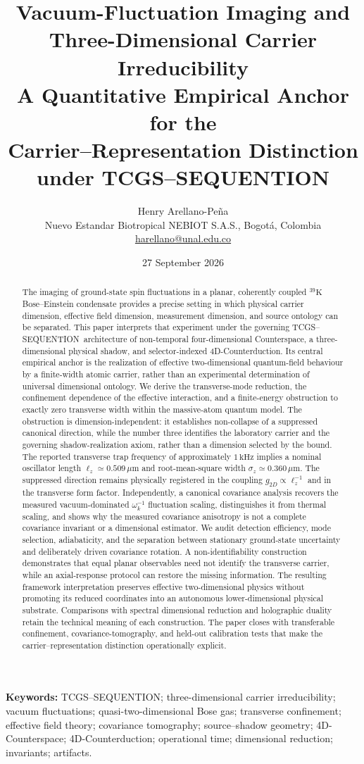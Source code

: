 \documentclass[11pt,a4paper]{article}
\title{Vacuum-Fluctuation Imaging and\\
Three-Dimensional Carrier Irreducibility\\[0.6em]
\large A Quantitative Empirical Anchor for the\\
Carrier--Representation Distinction under TCGS--SEQUENTION}
\author{Henry Arellano-Pe\~na\\\small Nuevo Estandar Biotropical NEBIOT S.A.S., Bogot\'a, Colombia\\\small\href{mailto:harellano@unal.edu.co}{harellano@unal.edu.co}}
\date{27 September 2026}
\theoremstyle{definition}
\theoremstyle{remark}
\newcommand{\TCGS}{TCGS--SEQUENTION}
\newcommand{\lop}{\ell_z}
\begin{document}
\maketitle
\begin{abstract}
The imaging of ground-state spin fluctuations in a planar, coherently coupled $^{39}\mathrm K$ Bose--Einstein condensate provides a precise setting in which physical carrier dimension, effective field dimension, measurement dimension, and source ontology can be separated. This paper interprets that experiment under the governing \TCGS\ architecture of non-temporal four-dimensional Counterspace, a three-dimensional physical shadow, and selector-indexed 4D-Counterduction. Its central empirical anchor is the realization of effective two-dimensional quantum-field behaviour by a finite-width atomic carrier, rather than an experimental determination of universal dimensional ontology. We derive the transverse-mode reduction, the confinement dependence of the effective interaction, and a finite-energy obstruction to exactly zero transverse width within the massive-atom quantum model. The obstruction is dimension-independent: it establishes non-collapse of a suppressed canonical direction, while the number three identifies the laboratory carrier and the governing shadow-realization axiom, rather than a dimension selected by the bound. The reported transverse trap frequency of approximately $1\,\mathrm{kHz}$ implies a nominal oscillator length $\lop\simeq0.509\,\mu\mathrm m$ and root-mean-square width $\sigma_z\simeq0.360\,\mu\mathrm m$. The suppressed direction remains physically registered in the coupling $g_{2D}\propto\lop^{-1}$ and in the transverse form factor. Independently, a canonical covariance analysis recovers the measured vacuum-dominated $\omega_k^{-1}$ fluctuation scaling, distinguishes it from thermal scaling, and shows why the measured covariance anisotropy is not a complete covariance invariant or a dimensional estimator. We audit detection efficiency, mode selection, adiabaticity, and the separation between stationary ground-state uncertainty and deliberately driven covariance rotation. A non-identifiability construction demonstrates that equal planar observables need not identify the transverse carrier, while an axial-response protocol can restore the missing information. The resulting framework interpretation preserves effective two-dimensional physics without promoting its reduced coordinates into an autonomous lower-dimensional physical substrate. Comparisons with spectral dimensional reduction and holographic duality retain the technical meaning of each construction. The paper closes with transferable confinement, covariance-tomography, and held-out calibration tests that make the carrier--representation distinction operationally explicit.
\end{abstract}
\noindent\textbf{Keywords:} \TCGS; three-dimensional carrier irreducibility; vacuum fluctuations; quasi-two-dimensional Bose gas; transverse confinement; effective field theory; covariance tomography; source--shadow geometry; 4D-Counterspace; 4D-Counterduction; operational time; dimensional reduction; invariants; artifacts.
\end{document}
